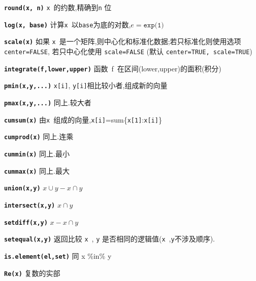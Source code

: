 \documentclass[landscape]{article}
\newcommand{\code}{\texttt}
\newcommand{\bcode}[1]{\texttt{\textbf{#1}}}
\begin{document}
\begin{multicols*}{3}
\bcode{round(x, n)} \code{x}~的约数,精确到\code{n} 位

\bcode{log(x, base)}  计算\code{x}~以\code{base}为底的对数,$e=\code{exp(1)}$

\bcode{scale(x)}  如果 \code{x}~是一个矩阵,则中心化和标准化数据;若只标准化则使用选项 \code{center=FALSE},
若只中心化使用 \code{scale=FALSE} (默认 \code{center=TRUE, scale=TRUE})

\bcode{integrate(f,lower,upper)}    函数~f~在区间(lower,upper)的面积(积分)

\bcode{pmin(x,y,...)}   \code{x[i]}, \code{y[i]}相比较小者,组成新的向量

\bcode{pmax(x,y,...)}   同上.较大者

\bcode{cumsum(x)}   由\code{x}~组成的向量,\code{x[i]}=sum\{\code{x[1]}:\code{x[i]}\}

\bcode{cumprod(x)}  同上.连乘

\bcode{cummin(x)}   同上.最小

\bcode{cummax(x)}   同上.最大

\bcode{union(x,y)} $x \cup y - x \cap y$

\bcode{intersect(x,y)}  $x \cap y$

\bcode{setdiff(x,y)}    $x - x \cap y$

\bcode{setequal(x,y)}   返回比较 \code{x}~, \code{y} 是否相同的逻辑值(\code{x}~,\code{y}不涉及顺序).

\bcode{is.element(el,set)}  同 x \%in\% y

\bcode{Re(x)}   复数的实部


\end{multicols*}
\end{document}
